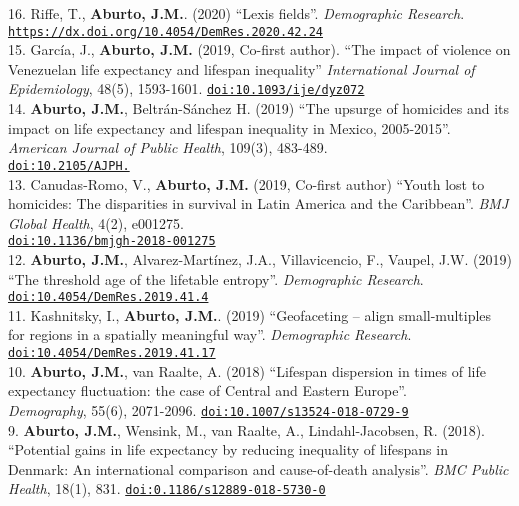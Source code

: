 \documentclass[12pt]{article}
\providecommand*\url[1]{\href{#1}{#1}}
\renewcommand*\url[1]{\href{#1}{\texttt{#1}}}
\begin{document}
16. Riffe, T., \textbf{Aburto, J.M.}. (2020) ``Lexis fields''. \textit{Demographic Research}. \\ 
 \url{https://dx.doi.org/10.4054/DemRes.2020.42.24} \\

15. Garc\'ia, J., \textbf{Aburto, J.M.} (2019, Co-first author). ``The impact of violence on Venezuelan life expectancy and lifespan inequality''  \textit{International Journal of Epidemiology}, 48(5), 1593-1601. \url{doi:10.1093/ije/dyz072}\\

14. \textbf{Aburto, J.M.}, Beltr\'an-S\'anchez H. (2019) ``The upsurge of homicides and its impact on life expectancy and lifespan inequality in Mexico, 2005-2015''. \textit{ American Journal of Public Health}, 109(3), 483-489. \\ \url{doi:10.2105/AJPH.}\\

13. Canudas-Romo, V., \textbf{Aburto, J.M.} (2019, Co-first author) ``Youth lost to homicides: The disparities in survival in Latin America and the Caribbean''. \textit{BMJ Global Health}, 4(2), e001275. \\ \url{doi:10.1136/bmjgh-2018-001275}\\

12. \textbf{Aburto, J.M.}, Alvarez-Mart\'inez, J.A., Villavicencio, F., Vaupel, J.W. (2019) ``The threshold age of the lifetable entropy''.  \textit{Demographic Research}. \url{doi:10.4054/DemRes.2019.41.4}\\

11. Kashnitsky, I., \textbf{Aburto, J.M.}. (2019) ``Geofaceting – align small-multiples for regions in a spatially meaningful way''. \textit{Demographic Research}. \url{doi:10.4054/DemRes.2019.41.17}\\

10. \textbf{Aburto, J.M.}, van Raalte, A. (2018) ``Lifespan dispersion in times of life expectancy fluctuation: the case of Central and Eastern Europe''.\\ \textit{Demography}, 55(6), 2071-2096. \url{doi:10.1007/s13524-018-0729-9} \\

9. \textbf{Aburto, J.M.}, Wensink, M., van Raalte, A., Lindahl-Jacobsen, R. (2018). ``Potential gains in life expectancy by reducing inequality of lifespans in Denmark: An international comparison and cause-of-death analysis''. \emph{BMC Public Health}, 18(1), 831. \url{doi:0.1186/s12889-018-5730-0} \\
\end{document}
